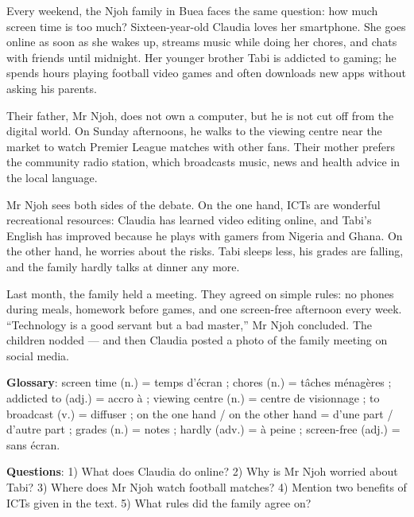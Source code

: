 \documentclass[11pt]{article}
\begin{document}
\begin{textebox}
Every weekend, the Njoh family in Buea faces the same question: how much screen time is too much? Sixteen-year-old Claudia loves her smartphone. She goes online as soon as she wakes up, streams music while doing her chores, and chats with friends until midnight. Her younger brother Tabi is addicted to gaming; he spends hours playing football video games and often downloads new apps without asking his parents.

Their father, Mr Njoh, does not own a computer, but he is not cut off from the digital world. On Sunday afternoons, he walks to the viewing centre near the market to watch Premier League matches with other fans. Their mother prefers the community radio station, which broadcasts music, news and health advice in the local language.

Mr Njoh sees both sides of the debate. On the one hand, ICTs are wonderful recreational resources: Claudia has learned video editing online, and Tabi's English has improved because he plays with gamers from Nigeria and Ghana. On the other hand, he worries about the risks. Tabi sleeps less, his grades are falling, and the family hardly talks at dinner any more.

Last month, the family held a meeting. They agreed on simple rules: no phones during meals, homework before games, and one screen-free afternoon every week. “Technology is a good servant but a bad master,” Mr Njoh concluded. The children nodded — and then Claudia posted a photo of the family meeting on social media.

\textbf{Glossary}: screen time (n.) = temps d'écran ; chores (n.) = tâches ménagères ; addicted to (adj.) = accro à ; viewing centre (n.) = centre de visionnage ; to broadcast (v.) = diffuser ; on the one hand / on the other hand = d'une part / d'autre part ; grades (n.) = notes ; hardly (adv.) = à peine ; screen-free (adj.) = sans écran.

\textbf{Questions}: 1) What does Claudia do online? 2) Why is Mr Njoh worried about Tabi? 3) Where does Mr Njoh watch football matches? 4) Mention two benefits of ICTs given in the text. 5) What rules did the family agree on?
\end{textebox}
\end{document}
